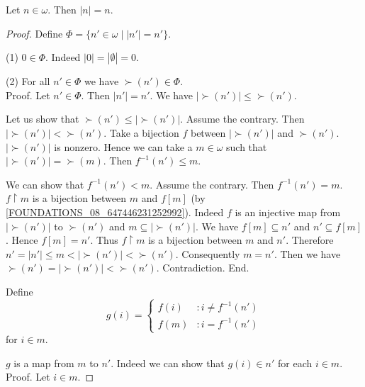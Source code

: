 \documentclass[10pt]{article}
\begin{document}
  \begin{forthel}
    \begin{theorem}
      Let $n \in \omega$.
      Then $|n| = n$.
    \end{theorem}
    \begin{proof}
      Define $\Phi = \{ n' \in \omega \mid |n'| = n' \}$.

      (1) $0 \in \Phi$.
      Indeed $|0| = |\emptyset| = 0$.

      (2) For all $n' \in \Phi$ we have $\succ(n') \in \Phi$. \\
      Proof.
        Let $n' \in \Phi$.
        Then $|n'| = n'$.
        We have $|\succ(n')| \leq \succ(n')$.

        Let us show that $\succ(n') \leq |\succ(n')|$.
          Assume the contrary.
          Then $|\succ(n')| < \succ(n')$.
          Take a bijection $f$ between $|\succ(n')|$ and $\succ(n')$.
          $|\succ(n')|$ is nonzero.
          Hence we can take a $m \in \omega$ such that $|\succ(n')| =
          \succ(m)$.
          Then $f^{-1}(n') \leq m$.

          We can show that $f^{-1}(n') < m$.
            Assume the contrary.
            Then $f^{-1}(n') = m$.
            $f \restriction m$ is a bijection between $m$ and $f[m]$ (by
            \cref{FOUNDATIONS_08_647446231252992}).
            Indeed $f$ is an injective map from $|\succ(n')|$ to $\succ(n')$ and
            $m \subseteq |\succ(n')|$.
            We have $f[m] \subseteq n'$ and $n' \subseteq f[m]$.
            Hence $f[m] = n'$.
            Thus $f \restriction m$ is a bijection between $m$ and $n'$.
            Therefore $n'
              = |n'|
              \leq m
              < |\succ(n')|
              < \succ(n')$.
            Consequently $m = n'$.
            Then we have $\succ(n') = |\succ(n')| < \succ(n')$.
            Contradiction.
          End.

          Define \[ g(i) =
            \begin{cases}
              f(i)  & : i \neq f^{-1}(n')
              \\
              f(m)  & : i = f^{-1}(n')
            \end{cases} \]
          for $i \in m$.

          $g$ is a map from $m$ to $n'$.
          Indeed we can show that $g(i) \in n'$ for each $i \in m$. \\
          Proof.
            Let $i \in m$.


\end{proof}
\end{forthel}
\end{document}
